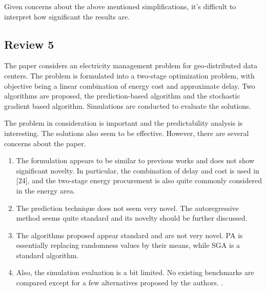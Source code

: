 Given concerns about the above mentioned simplifications, it's difficult to interpret how significant the results are.

\subsection{Review 5}

The paper considers an electricity management problem for geo-distributed data centers. The problem is formulated into a two-stage optimization problem, with objective being a linear combination of energy cost and approximate delay. Two algorithms are proposed, the prediction-based algorithm and the stochastic gradient based algorithm. Simulations are conducted to evaluate the solutions.

The problem in consideration is important and the predictability analysis is interesting. The solutions also seem to be effective. However, there are several concerns about the paper. 

\begin{enumerate}
	\item The formulation appears to be similar to previous works and does not show significant novelty. In particular, the combination of delay and cost is used in [24], and the two-stage energy procurement is also quite commonly considered in the energy area. 
	\item The prediction technique does not seem very novel. The autoregressive method seems quite standard and its novelty should be further discussed. 
	\item The algorithms proposed appear standard and are not very novel. PA is essentially replacing randomness values by their means, while SGA is a standard algorithm. 
	\item Also, the simulation evaluation is a bit limited. No existing benchmarks are compared except for a few alternatives proposed by the authors. .
\end{enumerate}